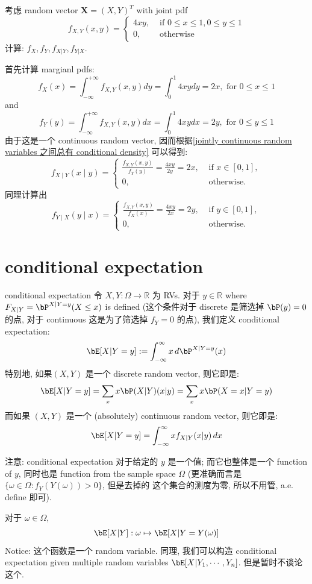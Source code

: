 \begin{example}
考虑 random vector \(\mathbf{X} = (X, Y)^T\) with joint pdf
\[
f_{X, Y}(x, y)= \begin{cases}4 x y, & \text { if } 0 \leq x \leq 1,0 \leq y \leq 1 \\ 0, & \text { otherwise }\end{cases}
\]
计算: \(f_X, f_Y, f_{X|Y}, f_{Y|X}\).

\begin{solution}
首先计算 margianl pdfs:
\[
f_X(x)=\int_{-\infty}^{+\infty} f_{X, Y}(x, y) d y=\int_0^1 4 x y d y=2 x, \text { for } 0 \leq x \leq 1
\]
and
\[
f_Y(y)=\int_{-\infty}^{+\infty} f_{X, Y}(x, y) d x=\int_0^1 4 x y d x=2 y, \text { for } 0 \leq y \leq 1
\]
由于这是一个 continuous random vector, 因而根据\ref{jointly continuous random variables 之间总有 conditional density} 可以得到:
\[
f_{X \mid Y}(x \mid y)= \begin{cases}\frac{f_{X, Y}(x, y)}{f_Y(y)}=\frac{4 x y}{2 y}=2 x, & \text { if } x \in[0,1], \\ 0, & \text { otherwise. }\end{cases}
\]
同理计算出
\[
f_{Y \mid X}(y \mid x)= \begin{cases}\frac{f_{X, Y}(x, y)}{f_X(x)}=\frac{4 x y}{2 x}=2 y, & \text { if } y \in[0,1], \\ 0, & \text { otherwise. }\end{cases}
\]
\end{solution}
\end{example}




\section{conditional expectation}
\begin{definition}{conditional expectation}\label{conditional expectation}
令 \(X, Y: \Omega \to \mathbb{R}\) 为 RVs. 
对于 \(y \in \mathbb{R}\) where \(F_{X|Y} = \bP^{X|Y =y}(X\leq x)\) is defined
 (这个条件对于 discrete 是筛选掉 \(\bP(y) =0\) 的点, 对于 continuous 这是为了筛选掉 \(f_Y = 0\) 的点), 
 我们定义 conditional expectation:
  \[
  \bE[X | Y = y] := \int_{-\infty}^{\infty} x \, d\bP^{X|Y=y}(x) 
  \]
  特别地, 如果\((X,Y)\) 是一个 discrete random vector, 则它即是:
  \[
   \bE[X | Y = y] = \sum_{x} x \bP(X | Y)(x|y) = \sum_{x} x \bP(X = x | Y = y)
  \]
  而如果 \((X,Y)\) 是一个 (absolutely) continuous random vector, 则它即是:
  \[
   \bE[X | Y = y] = \int_{-\infty}^{\infty} x f_{X|Y}(x|y) \, dx
  \]
\end{definition}
\begin{remark}
    注意: conditional expectation 对于给定的 \(y\) 是一个值;
     而它也整体是一个 function of \(y\), 同时也是 function from the sample space \(\Omega\)
 (更准确而言是 \(\{ \omega \in \Omega : f_Y(Y(\omega))>0  \}\), 但是去掉的
 这个集合的测度为零, 所以不用管, a.e. define 即可).

     对于 \(\omega \in \Omega\), \[
     \bE[X|Y]: \omega \mapsto \bE[X|Y=Y(\omega)]
     \]
     Notice: 这个函数是一个 random variable.
    同理, 我们可以构造 conditional expectation 
    given multiple random variables \(\bE[X|Y_1, \cdots, Y_n]\). 但是暂时不谈论这个.
\end{remark}


